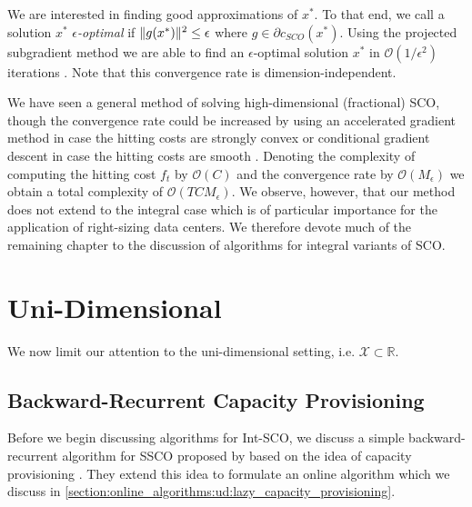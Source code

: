 We are interested in finding good approximations of $x^*$. To that end, we call a solution $x^*$ \textit{$\epsilon$-optimal} if $\lVert g(x^*)\rVert^2 \leq \epsilon$ where $g \in \partial c_{SCO}(x^*)$. Using the projected subgradient method we are able to find an $\epsilon$-optimal solution $x^*$ in $\mathcal{O}(1 / \epsilon^2)$ iterations \cite{Boyd2003}. Note that this convergence rate is dimension-independent.

We have seen a general method of solving high-dimensional (fractional) SCO, though the convergence rate could be increased by using an accelerated gradient method in case the hitting costs are strongly convex or conditional gradient descent in case the hitting costs are smooth \cite{Bubeck2015}. Denoting the complexity of computing the hitting cost $f_t$ by $\mathcal{O}(C)$ and the convergence rate by $\mathcal{O}(M_{\epsilon})$ we obtain a total complexity of $\mathcal{O}(T C M_{\epsilon})$. We observe, however, that our method does not extend to the integral case which is of particular importance for the application of right-sizing data centers. We therefore devote much of the remaining chapter to the discussion of algorithms for integral variants of SCO.

\section{Uni-Dimensional}

We now limit our attention to the uni-dimensional setting, i.e. $\mathcal{X} \subset \mathbb{R}$.

\subsection{Backward-Recurrent Capacity Provisioning}

Before we begin discussing algorithms for Int-SCO, we discuss a simple backward-recurrent algorithm for SSCO proposed by \citeauthor*{Lin2011} based on the idea of capacity provisioning \cite{Lin2011}. They extend this idea to formulate an online algorithm which we discuss in \autoref{section:online_algorithms:ud:lazy_capacity_provisioning}.

